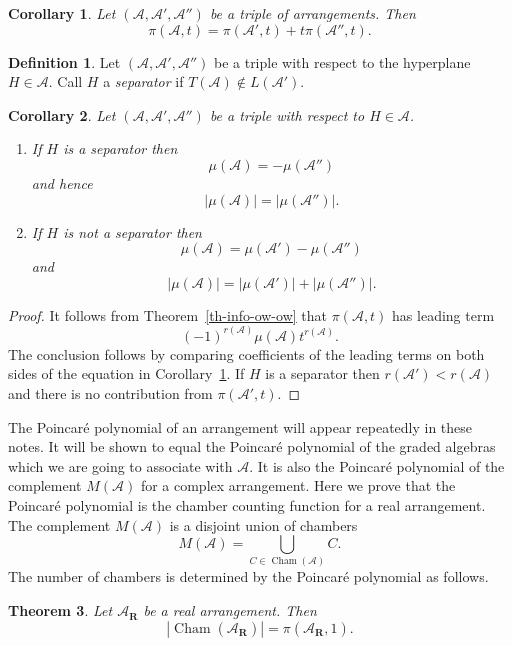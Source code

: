 \documentclass{article}
\newtheorem{thm}{Theorem}[section]
\newtheorem{cor}[thm]{Corollary}
\theoremstyle{definition}
\newtheorem{defn}{Definition}[section]
\theoremstyle{remark}
\newcommand{\thmref}[1]{Theorem~\ref{#1}}
\newcommand{\A}{\mathcal{A}}
\DeclareMathOperator{\Cham}{Cham}
\newcommand{\envert}[1]{\left\lvert#1\right\rvert}
\let\abs=\envert
\begin{document}
\begin{cor}\label{tripleA}
Let $(\A,\A',\A'')$ be a triple of arrangements. Then
\[ \pi (\A,t) = \pi (\A',t) + t \pi (\A'',t). \]
\end{cor}

\begin{defn}
Let $(\A,\A',\A'')$ be a triple with respect to
the hyperplane $H \in \A$. Call $H$ a \textit{separator}
if $T(\A) \not\in L(\A')$.
\end{defn}

\begin{cor}\label{nsep}
Let $(\A,\A',\A'')$ be a triple with respect to $H \in \A$.
\begin{enumerate}
\renewcommand{\labelenumi}{(\roman{enumi})}
\item
If $H$ is a separator then
\[ \mu (\A) = - \mu (\A'') \]
and hence
\[ \abs{\mu (\A)} = \abs{ \mu (\A'')}. \]

\item If $H$ is not a separator then
\[\mu (\A) = \mu (\A') - \mu (\A'') \]
and
\[ \abs{\mu (\A)} = \abs{\mu (\A')} + \abs{\mu (\A'')}. \]
\end{enumerate}
\end{cor}

\begin{proof}
It follows from \thmref{th-info-ow-ow} that $\pi(\A,t)$
has leading term
\[(-1)^{r(\A)}\mu (\A)t^{r(\A)}.\]
The conclusion
follows by comparing coefficients of the leading
terms on both sides of the equation in
Corollary~\ref{tripleA}. If $H$ is a separator then
$r(\A') < r(\A)$ and there is no contribution
from $\pi (\A',t)$.
\end{proof}

The Poincar\'e polynomial of an arrangement
will appear repeatedly
in these notes. It will be shown to equal the
Poincar\'e polynomial
of the graded algebras which we are going to
associate with $\A$. It is also the Poincar\'e
polynomial of the complement $M(\A)$ for a
complex arrangement. Here we prove
that the Poincar\'e polynomial is the chamber
counting function for a real arrangement. The
complement $M(\A)$ is a disjoint union of chambers
\[M(\A) = \bigcup_{C \in \Cham(\A)} C.\]
The number
of chambers is determined by the Poincar\'e
polynomial as follows.

\begin{thm}\label{th-realarr}
Let $\A_{\mathbf{R}}$ be a real arrangement. Then
\[ \abs{\Cham(\A_{\mathbf{R}})} = \pi (\A_{\mathbf{R}},1). \]
\end{thm}
\end{document}
